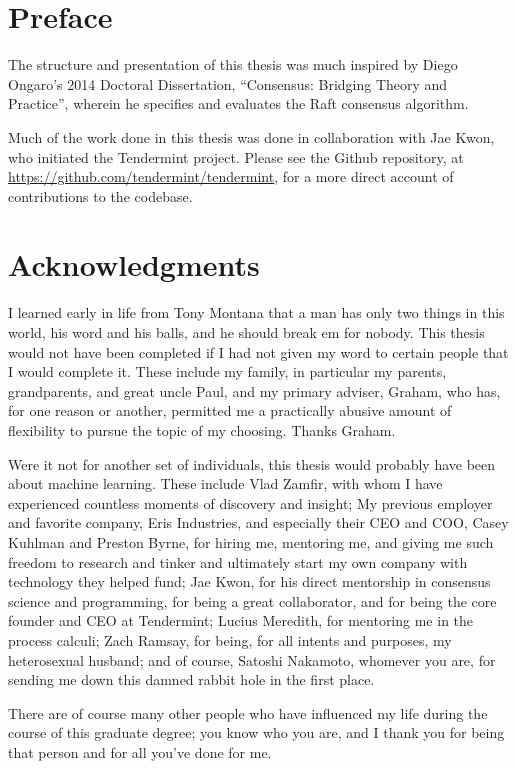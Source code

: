 
\par\vspace*{.35\textheight}{\centering Dedicated to Theda. \par}

\chapter*{Preface}
The structure and presentation of this thesis was much inspired by Diego Ongaro's 2014 Doctoral Dissertation, 
``Consensus: Bridging Theory and Practice'', wherein he specifies and evaluates the Raft consensus algorithm.

Much of the work done in this thesis was done in collaboration with Jae Kwon, who initiated the Tendermint project.
Please see the Github repository, at \url{https://github.com/tendermint/tendermint}, for a more direct account of contributions to the codebase.


\chapter*{Acknowledgments}
I learned early in life from Tony Montana that a man has only two things in this world, his word and his balls, and he should break em for nobody.
This thesis would not have been completed if I had not given my word to certain people that I would complete it.
These include my family, in particular my parents, grandparents, and great uncle Paul, and my primary adviser, Graham,
who has, for one reason or another, permitted me a practically abusive amount of flexibility to pursue the topic of my choosing.
Thanks Graham.

Were it not for another set of individuals, this thesis would probably have been about machine learning.
These include Vlad Zamfir, with whom I have experienced countless moments of discovery and insight;
My previous employer and favorite company, Eris Industries, and especially their CEO and COO, Casey Kuhlman and Preston Byrne,
for hiring me, mentoring me, and giving me such freedom to research and tinker and ultimately start my own company with technology they helped fund;
Jae Kwon, for his direct mentorship in consensus science and programming, for being a great collaborator, and for being the core founder and CEO at Tendermint;
Lucius Meredith, for mentoring me in the process calculi;
Zach Ramsay, for being, for all intents and purposes, my heterosexual husband;
and of course, Satoshi Nakamoto, whomever you are, for sending me down this damned rabbit hole in the first place.

There are of course many other people who have influenced my life during the course of this graduate degree;
you know who you are, and I thank you for being that person and for all you've done for me.

\tableofcontents
\listoffigures
\listoftables

